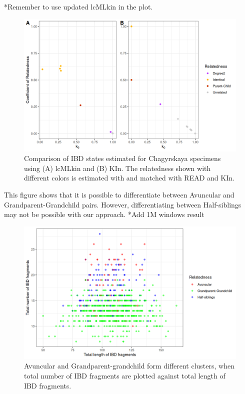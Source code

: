 \documentclass[12pt, letterpaper]{article}
\begin{document}
*Remember to use updated lcMLkin in the plot.
\begin{figure}[h]
    \centering
    \includegraphics[width=18cm]{supplementary_info/plots/lcPlot.png}
    \caption{Comparison of IBD states estimated for Chagyrskaya specimens using (A) lcMLkin and (B) KIn.
    The relatedness shown with different colors is estimated with and matched with READ and KIn.}
    \label{figS4}
\end{figure}

This figure shows that it is possible to differentiate between Avuncular and Grandparent-Grandchild pairs.
However, differentiating between Half-siblings may not be possible with our approach. 
*Add 1M windows result
\begin{figure}[h]
    \centering
    \includegraphics[width=18cm]{supplementary_info/plots/degree2_10Mwin.png}
    \caption{Avuncular and Grandparent-grandchild form different clusters, when total number of IBD fragments are plotted against total length of IBD fragments.}
    \label{figS5}
\end{figure}
\end{document}
